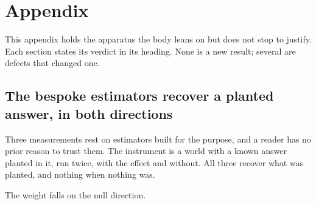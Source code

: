 %
%
%

\chapter{Appendix}
\label{sec:appendix}

\noindent
This appendix holds the apparatus the body leans on but does not stop to
justify. Each section states its verdict in its heading. None is a new result;
several are defects that changed one.

\section{The bespoke estimators recover a planted answer, in both directions}
\label{sec:app-planted}

\begin{question}
Three measurements rest on estimators built for the purpose, and a reader has no
prior reason to trust them. The instrument is a world with a known answer
planted in it, run twice, with the effect and without. All three recover what
was planted, and nothing when nothing was.
\end{question}

\noindent
The weight falls on the null direction.

